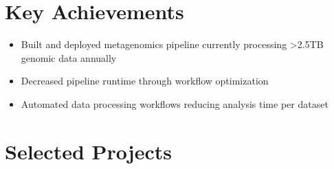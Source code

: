 \documentclass[11pt,a4paper,sans]{moderncv}
\begin{document}
\section{Key Achievements}
\begin{itemize}
	\item Built and deployed metagenomics pipeline currently processing >2.5TB genomic data annually  
	\item Decreased pipeline runtime through workflow optimization
	\item Automated data processing workflows reducing analysis time per dataset
\end{itemize}

\section{Selected Projects}
\end{document}
